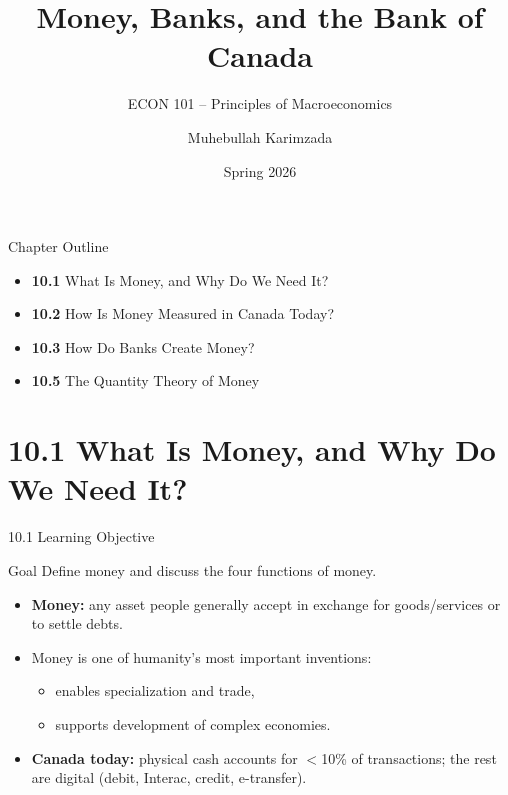 \documentclass[aspectratio=169]{beamer}
\title{\textbf{Money, Banks, and the Bank of Canada}}
\subtitle{{\large ECON 101 -- Principles of Macroeconomics}}
\author{Muhebullah Karimzada}
\date{Spring 2026}
\begin{document}

\begin{frame}[plain]
  \titlepage
\end{frame}

\begin{frame}{Chapter Outline}
\transfade
\begin{itemize}[<+->]
  \item \textbf{10.1} What Is Money, and Why Do We Need It?
  \item \textbf{10.2} How Is Money Measured in Canada Today?
  \item \textbf{10.3} How Do Banks Create Money?
  \item \textbf{10.5} The Quantity Theory of Money
\end{itemize}
\end{frame}

\section{10.1 What Is Money, and Why Do We Need It?}

\begin{frame}{10.1 Learning Objective}
\transfade
\begin{block}{Goal}
Define money and discuss the four functions of money.
\end{block}
\begin{itemize}[<+->]
  \item \textbf{Money:} any asset people generally accept in exchange for goods/services or to settle debts.
  \item Money is one of humanity's most important inventions:
  \begin{itemize}[<+->]
    \item enables specialization and trade,
    \item supports development of complex economies.
  \end{itemize}
  \item \textbf{Canada today:} physical cash accounts for $<$10\% of transactions; the rest are digital (debit, Interac, credit, e-transfer).
\end{itemize}
\end{frame}
\end{document}
